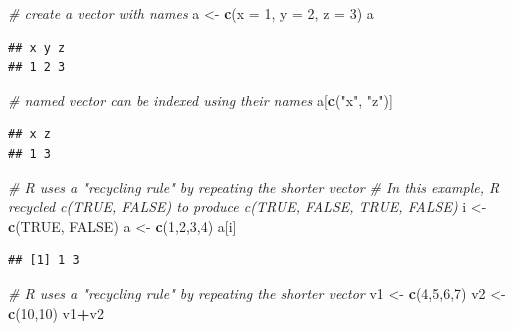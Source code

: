 \documentclass[]{book}
\newenvironment{Shaded}{\begin{snugshade}}{\end{snugshade}}
\newcommand{\CommentTok}[1]{\textcolor[rgb]{0.56,0.35,0.01}{\textit{#1}}}
\newcommand{\DataTypeTok}[1]{\textcolor[rgb]{0.13,0.29,0.53}{#1}}
\newcommand{\DecValTok}[1]{\textcolor[rgb]{0.00,0.00,0.81}{#1}}
\newcommand{\KeywordTok}[1]{\textcolor[rgb]{0.13,0.29,0.53}{\textbf{#1}}}
\newcommand{\NormalTok}[1]{#1}
\newcommand{\OperatorTok}[1]{\textcolor[rgb]{0.81,0.36,0.00}{\textbf{#1}}}
\newcommand{\OtherTok}[1]{\textcolor[rgb]{0.56,0.35,0.01}{#1}}
\newcommand{\StringTok}[1]{\textcolor[rgb]{0.31,0.60,0.02}{#1}}
\begin{document}
\begin{Shaded}
\begin{Highlighting}[]
\CommentTok{# create a vector with names}
\NormalTok{a <-}\StringTok{ }\KeywordTok{c}\NormalTok{(}\DataTypeTok{x =} \DecValTok{1}\NormalTok{, }\DataTypeTok{y =} \DecValTok{2}\NormalTok{, }\DataTypeTok{z =} \DecValTok{3}\NormalTok{)}
\NormalTok{a}
\end{Highlighting}
\end{Shaded}

\begin{verbatim}
## x y z 
## 1 2 3
\end{verbatim}

\begin{Shaded}
\begin{Highlighting}[]
\CommentTok{# named vector can be indexed using their names}
\NormalTok{a[}\KeywordTok{c}\NormalTok{(}\StringTok{"x"}\NormalTok{, }\StringTok{"z"}\NormalTok{)]}
\end{Highlighting}
\end{Shaded}

\begin{verbatim}
## x z 
## 1 3
\end{verbatim}

\begin{Shaded}
\begin{Highlighting}[]
\CommentTok{# R uses a "recycling rule" by repeating the shorter vector}
\CommentTok{# In this example, R recycled c(TRUE, FALSE) to produce c(TRUE, FALSE, TRUE, FALSE)}
\NormalTok{i <-}\StringTok{ }\KeywordTok{c}\NormalTok{(}\OtherTok{TRUE}\NormalTok{, }\OtherTok{FALSE}\NormalTok{)}
\NormalTok{a <-}\StringTok{ }\KeywordTok{c}\NormalTok{(}\DecValTok{1}\NormalTok{,}\DecValTok{2}\NormalTok{,}\DecValTok{3}\NormalTok{,}\DecValTok{4}\NormalTok{)}
\NormalTok{a[i]}
\end{Highlighting}
\end{Shaded}

\begin{verbatim}
## [1] 1 3
\end{verbatim}

\begin{Shaded}
\begin{Highlighting}[]
\CommentTok{# R uses a "recycling rule" by repeating the shorter vector}
\NormalTok{v1 <-}\StringTok{ }\KeywordTok{c}\NormalTok{(}\DecValTok{4}\NormalTok{,}\DecValTok{5}\NormalTok{,}\DecValTok{6}\NormalTok{,}\DecValTok{7}\NormalTok{)}
\NormalTok{v2 <-}\StringTok{ }\KeywordTok{c}\NormalTok{(}\DecValTok{10}\NormalTok{,}\DecValTok{10}\NormalTok{)}
\NormalTok{v1}\OperatorTok{+}\NormalTok{v2}
\end{Highlighting}
\end{Shaded}
\end{document}
